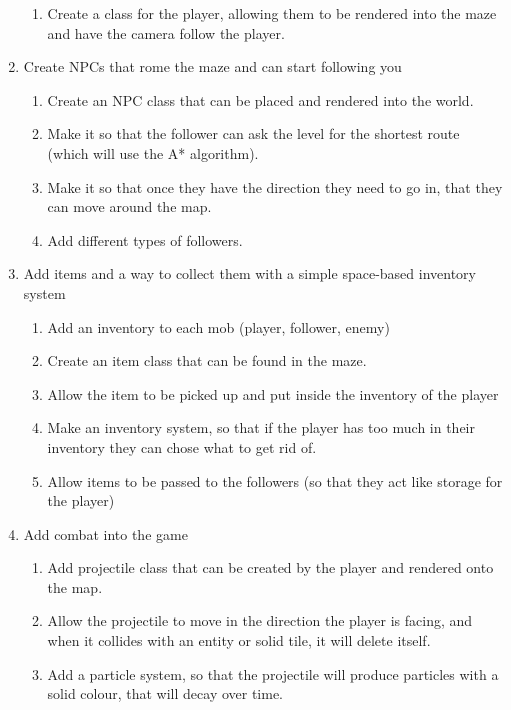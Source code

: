 \documentclass[../Main.tex]{subfiles}
\begin{document}
\begin{enumerate}
\begin{enumerate}
                    \item Create a class for the player, allowing them to be rendered into the maze and have the camera follow the player.
                \end{enumerate}
            \item Create NPCs that rome the maze and can start following you
                \begin{enumerate}
                    \item Create an NPC class that can be placed and rendered into the world.
                    \item Make it so that the follower can ask the level for the shortest route (which will use the A* algorithm).
                    \item Make it so that once they have the direction they need to go in, that they can move around the map.
                    \item Add different types of followers.
                \end{enumerate}
            \item Add items and a way to collect them with a simple space-based inventory system
                \begin{enumerate}
                    \item Add an inventory to each mob (player, follower, enemy)
                    \item Create an item class that can be found in the maze.
                    \item Allow the item to be picked up and put inside the inventory of the player
                    \item Make an inventory system, so that if the player has too much in their inventory they can chose what to get rid of.
                    \item Allow items to be passed to the followers (so that they act like storage for the player)
                \end{enumerate}
            \item Add combat into the game
                \begin{enumerate}
                    \item Add projectile class that can be created by the player and rendered onto the map.
                    \item Allow the projectile to move in the direction the player is facing, and when it collides with an entity or solid tile, it will delete itself.
                    \item Add a particle system, so that the projectile will produce particles with a solid colour, that will decay over time.

\end{enumerate}
\end{enumerate}
\end{document}
